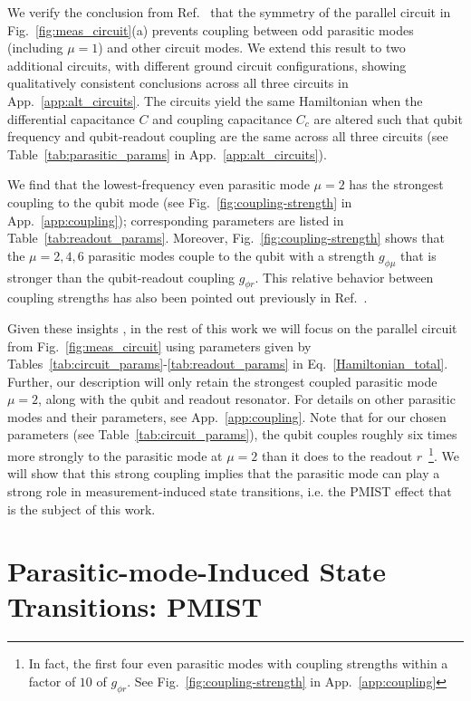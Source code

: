 \documentclass[%
reprint,
superscriptaddress,
 amsmath,amssymb,
 aps,
 prx,
longbibliography,
floatfix,
]{revtex4-2}
\begin{document}
We verify the conclusion from Ref.~\cite{viola2015collective} that the symmetry of the parallel circuit in Fig.~\ref{fig:meas_circuit}(a) prevents coupling between odd parasitic modes (including $\mu=1$) and other circuit modes. We extend this result to two additional circuits, with different ground circuit configurations, showing qualitatively consistent conclusions across all three circuits in App.~\ref{app:alt_circuits}. The circuits yield the same Hamiltonian when the differential capacitance $C$ and coupling capacitance $C_c$ are altered such that qubit frequency and qubit-readout coupling are the same across all three circuits (see Table~\ref{tab:parasitic_params} in App.~\ref{app:alt_circuits}). 
 
 We find that the lowest-frequency even parasitic mode $\mu=2$ has the strongest coupling to the qubit mode (see Fig.~\ref{fig:coupling-strength} in App.~\ref{app:coupling}); corresponding parameters are listed in Table~\ref{tab:readout_params}. Moreover, Fig.~\ref{fig:coupling-strength} shows that the $\mu=2,4,6$ parasitic modes couple to the qubit with a strength $g_{\phi\mu}$ that is stronger than the qubit-readout coupling $g_{\phi r}$. This relative behavior between coupling strengths has also been pointed out previously in Ref.~\cite{viola2015collective}.
 
 Given these insights%
 , in the rest of this work we will focus on the parallel circuit from Fig.~\ref{fig:meas_circuit} using parameters given by Tables~\ref{tab:circuit_params}-\ref{tab:readout_params} in Eq.~\ref{Hamiltonian_total}.  Further, our description will only retain the strongest coupled parasitic mode $\mu = 2$, along with the qubit and readout resonator.  For details on other parasitic modes and their parameters, see App.~\ref{app:coupling}. Note that for our chosen parameters (see Table~\ref{tab:circuit_params}), the qubit couples roughly six times more strongly to the parasitic mode at $\mu=2$ than it does to the readout $r$~\footnote{In fact, the first four even parasitic modes with coupling strengths within a factor of $10$ of $g_{\phi r}$. See Fig.~\ref{fig:coupling-strength} in App.~\ref{app:coupling}}.  We will show that this strong coupling implies that the parasitic mode can play a strong role in measurement-induced state transitions, i.e. the PMIST effect that is the subject of this work.   

\section{Parasitic-mode-Induced State Transitions: PMIST}\label{sec:MIST}
\end{document}
